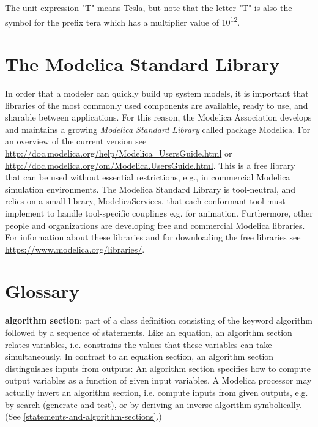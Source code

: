 \documentclass[10pt,a4paper]{report}
\def\doublelabel#1{\label{#1}\hypertarget{#1}{}}
\begin{document}
The unit expression "T" means Tesla, but note that the letter "T" is
also the symbol for the prefix tera which has a multiplier value of
10\textsuperscript{12}.

\chapter{The Modelica Standard Library}\doublelabel{the-modelica-standard-library}

In order that a modeler can quickly build up system models, it is
important that libraries of the most commonly used components are
available, ready to use, and sharable between applications. For this
reason, the Modelica Association develops and maintains a growing
\emph{Modelica Standard Library} called package Modelica. For an
overview of the current version see
\url{http://doc.modelica.org/help/Modelica_UsersGuide.html} or
\url{http://doc.modelica.org/om/Modelica.UsersGuide.html}. This is a
free library that can be used without essential restrictions, e.g., in
commercial Modelica simulation environments. The Modelica Standard
Library is tool-neutral, and relies on a small library,
ModelicaServices, that each conformant tool must implement to handle
tool-specific couplings e.g. for animation. Furthermore, other people
and organizations are developing free and commercial Modelica libraries.
For information about these libraries and for downloading the free
libraries see \url{https://www.modelica.org/libraries/}.

\appendix
\chapter{Glossary}\doublelabel{glossary}

\textbf{algorithm section}: part of a class definition consisting of the
keyword algorithm followed by a sequence of statements. Like an
equation, an algorithm section relates variables, i.e. constrains the
values that these variables can take simultaneously. In contrast to an
equation section, an algorithm section distinguishes inputs from
outputs: An algorithm section specifies how to compute output variables
as a function of given input variables. A Modelica processor may
actually invert an algorithm section, i.e. compute inputs from given
outputs, e.g. by search (generate and test), or by deriving an inverse
algorithm symbolically. (See \ref{statements-and-algorithm-sections}.)
\end{document}
